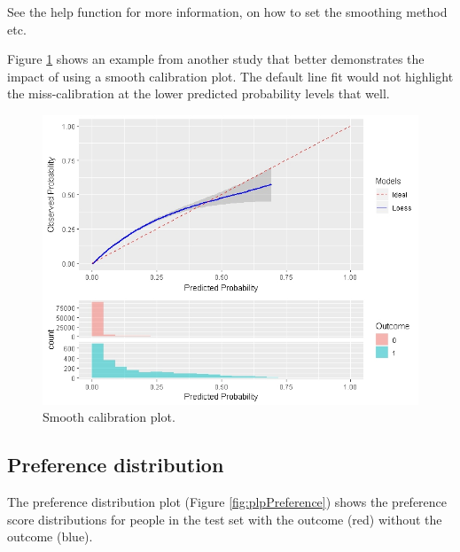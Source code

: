 \documentclass[]{book}
\begin{document}
See the help function for more information, on how to set the smoothing
method etc.

Figure \ref{fig:plpSmoothCal} shows an example from another study that
better demonstrates the impact of using a smooth calibration plot. The
default line fit would not highlight the miss-calibration at the lower
predicted probability levels that well.

\begin{figure}

{\centering \includegraphics[width=1\linewidth]{images/PatientLevelPrediction/smoothCalibration} 

}

\caption{Smooth calibration plot.}\label{fig:plpSmoothCal}
\end{figure}

\subsection{Preference distribution}\label{preference-distribution}

The preference distribution plot (Figure \ref{fig:plpPreference}) shows
the preference score distributions for people in the test set with the
outcome (red) without the outcome (blue).
\end{document}
